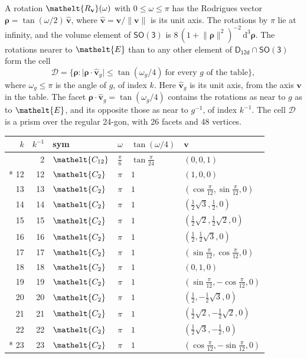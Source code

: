\documentclass[10pt,a4paper]{article}
\numberwithin{equation}{section}
\newcommand{\eltfont}[1]{{\let\sigma\eltsigma\mathelt{#1}}}
\newcommand{\grp}[1]{\mathsf{#1}}
\newcommand{\cls}[1]{\eltfont{#1}}
\newcommand{\elt}[1]{\eltfont{#1}}
\newcommand{\dirvec}[3]{(#1, #2, #3)}
\newcommand{\unitaxis}{\hat{\mathbf{v}}}
\newcommand{\vv}{\mathbf{v}}
\newcommand{\diff}{\mathrm{d}}
\newcommand{\rodrigues}{\boldsymbol{\rho}}
\newcommand{\fcell}{\mathcal{D}}
\begin{document}
\leavevmode\label{n:vector.rodrigues}\label{n:vector.unitaxis}A rotation $\elt{R_{\vv}}(\omega)$ with $0 \le \omega \le \pi$ has the Rodrigues vector $\rodrigues = \tan(\omega/2)\,\unitaxis$, where $\unitaxis = \vv/\lVert\vv\rVert$ is its unit axis. The rotations by $\pi$ lie at infinity, and the volume element of \href{SO3.pdf}{$\grp{SO(3)}$} is $8\,(1 + \lVert\rodrigues\rVert^2)^{-2}\,\diff^3\rodrigues$.
\leavevmode\label{n:set.cell}The rotations nearer to $\elt{E}$ than to any other element of $\grp{D_{12d}} \cap \grp{SO(3)}$ form the cell
\begin{equation}\label{e:cell}\fcell = \bigl\{\rodrigues : \lvert\rodrigues\cdot\unitaxis_g\rvert \le \tan(\omega_g/4)\ \text{for every $g$ of the table}\bigr\},\end{equation}
where $\omega_g \le \pi$ is the angle of $g$, of index $k$. Here $\unitaxis_g$ is its unit axis, from the axis $\vv$ in the table. The facet $\rodrigues\cdot\unitaxis_g = \tan(\omega_g/4)$ contains the rotations as near to $g$ as to $\elt{E}$, and its opposite those as near to $g^{-1}$, of index $k^{-1}$. The cell $\fcell$ is a prism over the regular 24-gon, with 26 facets and 48 vertices.
{\small{\renewcommand{\arraystretch}{1.3}\begin{longtable}{@{}rrllll@{}}\toprule
$k$ & $k^{-1}$ & sym & $\omega$ & $\tan(\omega/4)$ & $\vv$\\\midrule\endhead
\bottomrule\endfoot\endlastfoot
1 & 2 & $\cls{C_{12}}$ & $\tfrac{\pi}{6}$ & $\tan\tfrac{\pi}{24}$ & $\dirvec{0}{0}{1}$\\*
12 & 12 & $\cls{C_{2}}$ & $\pi$ & $1$ & $\dirvec{1}{0}{0}$\\
13 & 13 & $\cls{C_{2}}$ & $\pi$ & $1$ & $\dirvec{\cos\tfrac{\pi}{12}}{\sin\tfrac{\pi}{12}}{0}$\\
14 & 14 & $\cls{C_{2}}$ & $\pi$ & $1$ & $\dirvec{\tfrac{1}{2}\sqrt{3}}{\tfrac{1}{2}}{0}$\\
15 & 15 & $\cls{C_{2}}$ & $\pi$ & $1$ & $\dirvec{\tfrac{1}{2}\sqrt{2}}{\tfrac{1}{2}\sqrt{2}}{0}$\\
16 & 16 & $\cls{C_{2}}$ & $\pi$ & $1$ & $\dirvec{\tfrac{1}{2}}{\tfrac{1}{2}\sqrt{3}}{0}$\\
17 & 17 & $\cls{C_{2}}$ & $\pi$ & $1$ & $\dirvec{\sin\tfrac{\pi}{12}}{\cos\tfrac{\pi}{12}}{0}$\\
18 & 18 & $\cls{C_{2}}$ & $\pi$ & $1$ & $\dirvec{0}{1}{0}$\\
19 & 19 & $\cls{C_{2}}$ & $\pi$ & $1$ & $\dirvec{\sin\tfrac{\pi}{12}}{-\cos\tfrac{\pi}{12}}{0}$\\
20 & 20 & $\cls{C_{2}}$ & $\pi$ & $1$ & $\dirvec{\tfrac{1}{2}}{-\tfrac{1}{2}\sqrt{3}}{0}$\\
21 & 21 & $\cls{C_{2}}$ & $\pi$ & $1$ & $\dirvec{\tfrac{1}{2}\sqrt{2}}{-\tfrac{1}{2}\sqrt{2}}{0}$\\
22 & 22 & $\cls{C_{2}}$ & $\pi$ & $1$ & $\dirvec{\tfrac{1}{2}\sqrt{3}}{-\tfrac{1}{2}}{0}$\\*
23 & 23 & $\cls{C_{2}}$ & $\pi$ & $1$ & $\dirvec{\cos\tfrac{\pi}{12}}{-\sin\tfrac{\pi}{12}}{0}$\\
\bottomrule\end{longtable}}}
\end{document}
